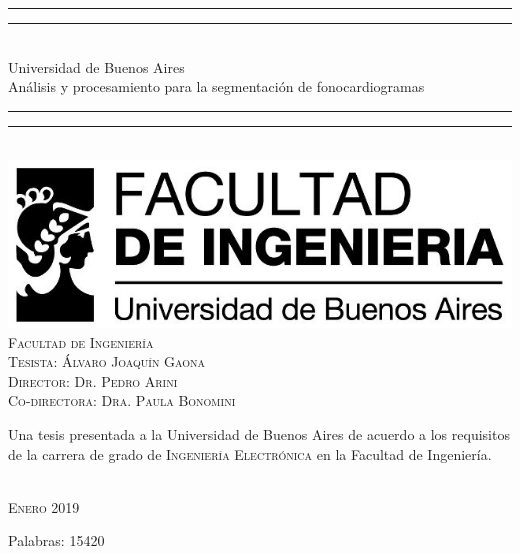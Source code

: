 \begin{titlepage}
\vspace*{5mm}
\begin{center}
\rule[0.5ex]{\linewidth}{2pt}\vspace*{-\baselineskip}\vspace*{3.2pt}
\rule[0.5ex]{\linewidth}{1pt}\\[\baselineskip]
{\Huge Universidad de Buenos Aires }\\[4mm]
{\Large Análisis y procesamiento para la segmentación de fonocardiogramas}\\
\rule[0.5ex]{\linewidth}{1pt}\vspace*{-\baselineskip}\vspace{3.2pt}
\rule[0.5ex]{\linewidth}{2pt}\\
\vspace{6.5mm}
\includegraphics[scale=0.4]{logo-facu-caratula}\\
\vspace{6mm}
{\large %
\textsc{Facultad de Ingeniería}}\\
\vspace{6.5mm}
{\large\textsc{Tesista: Álvaro Joaquín Gaona}}\\
{\large\textsc{Director: Dr. Pedro Arini}}\\
{\large\textsc{Co-directora: Dra. Paula Bonomini}}\\
\vspace{11mm}
\begin{minipage}{14.1cm}
Una tesis presentada a la Universidad de Buenos Aires de acuerdo a los requisitos de la carrera de grado de \textsc{Ingeniería} \textsc{Electrónica} en la Facultad de Ingeniería.
\end{minipage}\\
\vspace{9mm}
{\large\textsc{Enero 2019}}
\vspace{12mm}
\end{center}
\begin{flushright}
{\small Palabras: 15420}
\end{flushright}
\end{titlepage}